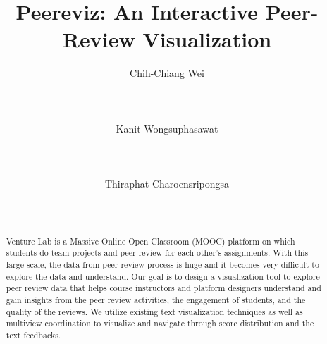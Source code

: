 \documentclass{sigchi}
\begin{document}
\title{Peereviz: An Interactive Peer-Review Visualization}

\author{
  \alignauthor Chih-Chiang Wei\\
    \\
    \\
    \\
  \alignauthor Kanit Wongsuphasawat\\
    \\
    \\
    \\
  \alignauthor Thiraphat Charoensripongsa\\
    \\
    \\
}


\maketitle

\begin{abstract}

Venture Lab is a Massive Online Open Classroom (MOOC) platform on which students do team projects and peer review for each other's assignments. With this large scale, the data from peer review process is huge and it becomes very difficult to explore the data and understand. Our goal is to design a visualization tool to explore peer review data that helps course instructors and platform designers understand and gain insights from the peer review activities, the engagement of students, and the quality of the reviews. We utilize existing text visualization techniques as well as multiview coordination to visualize and navigate through score distribution and the text feedbacks.

\end{abstract}

\end{document}
